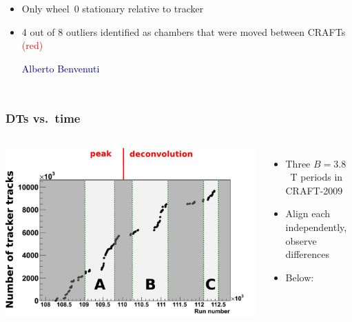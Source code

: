 \documentclass[compress]{beamer}
\begin{document}
\begin{frame}
\begin{columns}
\begin{itemize}
{\scriptsize $^*$not including outliers}

\item Only wheel~0 stationary relative to tracker

\item 4 out of 8 outliers identified as chambers that were moved between
  CRAFTs \textcolor{red}{(red)}

\hfill \textcolor{darkblue}{\scriptsize Alberto Benvenuti}
\end{itemize}

\end{columns}
\end{frame}

\begin{frame}
\frametitle{DTs vs.~time}

\begin{columns}
\includegraphics[width=\linewidth]{bfield_regions.pdf}
\begin{itemize}
\item Three $B=3.8$~T periods in CRAFT-2009
\item Align each independently, observe differences
\item Below: 

\end{itemize}
\end{columns}


\end{frame}
\end{document}
